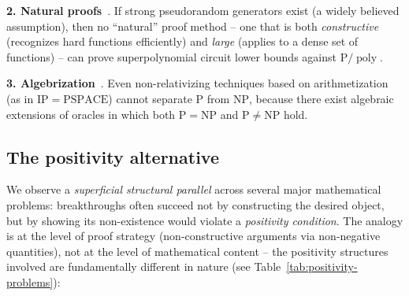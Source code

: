 \documentclass[aps,prd,twocolumn,superscriptaddress,nofootinbib]{revtex4-2}
\theoremstyle{definition}
\theoremstyle{remark}
\DeclareMathOperator{\poly}{poly}
\newcommand{\NP}{\mathrm{NP}}
\newcommand{\PP}{\mathrm{P}}
\begin{document}
\textbf{2. Natural proofs}~\cite{RazborovRudich1997}. If strong pseudorandom generators exist (a widely believed assumption), then no ``natural'' proof method -- one that is both \textit{constructive} (recognizes hard functions efficiently) and \textit{large} (applies to a dense set of functions) -- can prove superpolynomial circuit lower bounds against $\PP/\poly$.

\textbf{3. Algebrization}~\cite{AaronsonWigderson2009}. Even non-relativizing techniques based on arithmetization (as in $\mathrm{IP} = \mathrm{PSPACE}$) cannot separate $\PP$ from $\NP$, because there exist algebraic extensions of oracles in which both $\PP = \NP$ and $\PP \neq \NP$ hold.

\subsection{The positivity alternative}

We observe a \textit{superficial structural parallel} across several major mathematical problems: breakthroughs often succeed not by constructing the desired object, but by showing its non-existence would violate a \textit{positivity condition}. The analogy is at the level of proof strategy (non-constructive arguments via non-negative quantities), not at the level of mathematical content -- the positivity structures involved are fundamentally different in nature (see Table~\ref{tab:positivity-problems}):

\begin{table}[htbp]
\caption{Positive structures and proof strategies across foundational mathematical and computational problems.}
\label{tab:positivity-problems}
\centering
{}
\end{table}
\end{document}
